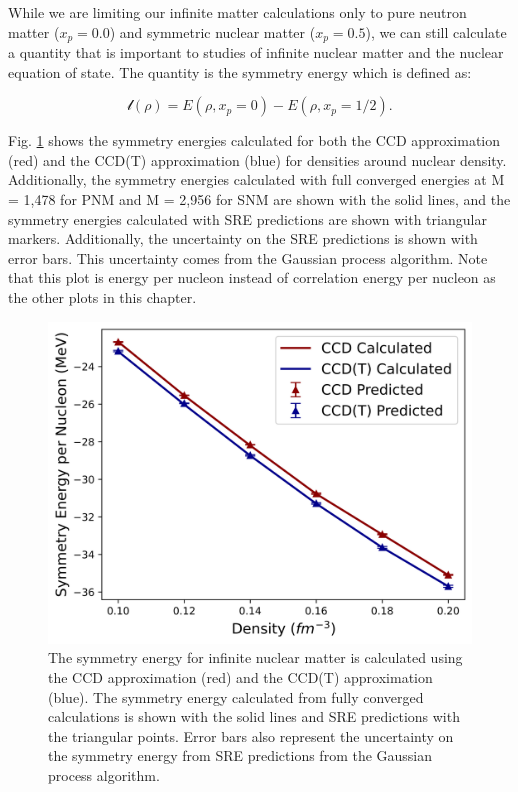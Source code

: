 While we are limiting our infinite matter calculations only to pure neutron matter ($x_p = 0.0$) and symmetric nuclear matter ($x_p = 0.5$), we can still calculate a quantity that is important to studies of infinite nuclear matter and the nuclear equation of state. The quantity is the symmetry energy which is defined as:

    \begin{equation}
        \mathcal{l}(\rho) = E(\rho, x_p=0) - E(\rho, x_p=1/2).
    \end{equation}

Fig. \ref{fig:symmetry} shows the symmetry energies calculated for both the CCD approximation (red) and the CCD(T) approximation (blue) for densities around nuclear density. Additionally, the symmetry energies calculated with full converged energies at M = 1,478 for PNM and M = 2,956 for SNM are shown with the solid lines, and the symmetry energies calculated with SRE predictions are shown with triangular markers. Additionally, the uncertainty on the SRE predictions is shown with error bars. This uncertainty comes from the Gaussian process algorithm.  Note that this plot is energy per nucleon instead of correlation energy per nucleon as the other plots in this chapter.

\begin{figure}
    \centering
    \includegraphics[scale=0.75]{Images/Chapter8/symmetryenergy.png}
    \caption{The symmetry energy for infinite nuclear matter is calculated using the CCD approximation (red) and the CCD(T) approximation (blue). The symmetry energy calculated from fully converged calculations is shown with the solid lines and SRE predictions with the triangular points. Error bars also represent the uncertainty on the symmetry energy from SRE predictions from the Gaussian process algorithm.}
    \label{fig:symmetry}
\end{figure}

